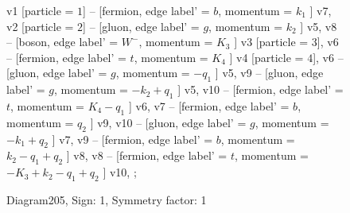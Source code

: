 \documentclass{revtex4}
\begin{document}
\begin{figure}[!htb]
\begin{center}
{    %
v1 [particle = \(1\)] -- [fermion, edge label' = \(b\), momentum = \(k_{1}\) ] v7, 
v2 [particle = \(2\)] -- [gluon, edge label' = \(g\), momentum = \(k_{2}\) ] v5, 
v8 -- [boson, edge label' = \(W^{-}\), momentum = \(K_{3}\) ] v3 [particle = \(3\)], 
v6 -- [fermion, edge label' = \(t\), momentum = \(K_{4}\) ] v4 [particle = \(4\)], 
v6 -- [gluon, edge label' = \(g\), momentum = \(-q_{1}\) ] v5, 
v9 -- [gluon, edge label' = \(g\), momentum = \(-k_{2} + q_{1}\) ] v5, 
v10 -- [fermion, edge label' = \(t\), momentum = \(K_{4} - q_{1}\) ] v6, 
v7 -- [fermion, edge label' = \(b\), momentum = \(q_{2}\) ] v9, 
v10 -- [gluon, edge label' = \(g\), momentum = \(-k_{1} + q_{2}\) ] v7, 
v9 -- [fermion, edge label' = \(b\), momentum = \(k_{2} - q_{1} + q_{2}\) ] v8, 
v8 -- [fermion, edge label' = \(t\), momentum = \(-K_{3} + k_{2} - q_{1} + q_{2}\) ] v10, 
};
\end{center}
\caption{Diagram205, Sign: 1, Symmetry factor: 1}
\end{figure}
\newpage
\end{document}
